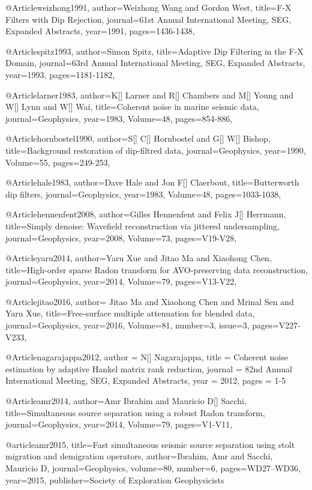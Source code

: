 @Article{weizhong1991,
  author={Weizhong Wang and Gordon West},
  title={F-X Filters with Dip Rejection},
  journal={61st Annual International Meeting, SEG, Expanded Abstracts},
  year=1991,
  pages={1436-1438},
}

@Article{spitz1993,
  author={Simon Spitz},
  title={Adaptive Dip Filtering in the F-X Domain},
  journal={63rd Annual International Meeting, SEG, Expanded Abstracts},
  year=1993,
  pages={1181-1182},
}


@Article{larner1983,
  author={K[] Larner and R[] Chambers and M[] Young and W[] Lynn and W[] Wai},
  title={Coherent noise in marine seismic data},
  journal={Geophysics},
  year=1983,
  Volume=48,
  pages={854-886},
}

@Article{hornbostel1990,
  author={S[] C[] Hornbostel and G[] W[] Bishop},
  title={Background restoration of dip-filtred data},
  journal={Geophysics},
  year=1990,
  Volume=55,
  pages={249-253},
}

@Article{hale1983,
  author={Dave Hale and Jon F[] Claerbout},
  title={Butterworth dip filters},
  journal={Geophysics},
  year=1983,
  Volume=48,
  pages={1033-1038},
}

@Article{hennenfent2008,
  author={Gilles Hennenfent and Felix J[] Herrmann},
  title={Simply denoise: Wavefield reconstruction via jittered undersampling},
  journal={Geophysics},
  year=2008,
  Volume=73,
  pages={V19-V28},
}

@Article{yaru2014,
  author={Yaru Xue and Jitao Ma and Xiaohong Chen},
  title={High-order sparse Radon transform for AVO-preserving data reconstruction},
  journal={Geophysics},
  year=2014,
  Volume=79,
  pages={V13-V22},
}

@Article{jitao2016,
  author={ Jitao Ma and Xiaohong Chen and Mrinal Sen and Yaru Xue},
  title={Free-surface multiple attenuation for blended data},
  journal={Geophysics},
  year=2016,
  Volume=81,
  number=3,
  issue=3,
  pages={V227-V233},
}

@Article{nagarajappa2012,
  author = 	 {N[] Nagarajappa},
  title = 	 {Coherent noise estimation by adaptive Hankel matrix rank reduction},
  journal = 	 {82nd Annual International Meeting, SEG, Expanded Abstracts},
  year = 	 2012,
  pages =	 {1-5}
}

@Article{amr2014,
  author={Amr Ibrahim and Mauricio D[] Sacchi},
  title={Simultaneous source separation using a robust Radon transform},
  journal={Geophysics},
  year=2014,
  Volume=79,
  pages={V1-V11},
}

@article{amr2015,
  title={Fast simultaneous seismic source separation using stolt migration and demigration operators},
  author={Ibrahim, Amr and Sacchi, Mauricio D},
  journal={Geophysics},
  volume={80},
  number={6},
  pages={WD27--WD36},
  year={2015},
  publisher={Society of Exploration Geophysicists}
}

